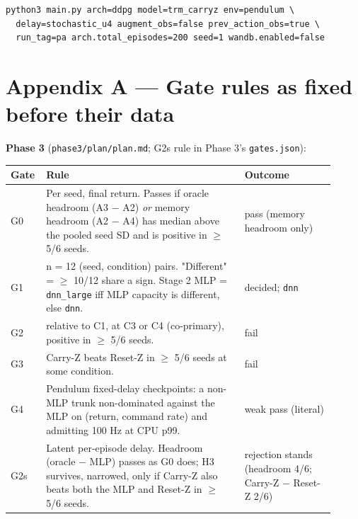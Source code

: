 \documentclass[11pt]{article}
\begin{document}
{\small\begin{verbatim}
python3 main.py arch=ddpg model=trm_carryz env=pendulum \
  delay=stochastic_u4 augment_obs=false prev_action_obs=true \
  run_tag=pa arch.total_episodes=200 seed=1 wandb.enabled=false
\end{verbatim}}



\medskip



\section*{Appendix A --- Gate rules as fixed before their data}



\textbf{Phase 3} (\texttt{phase3/\allowbreak{}plan/\allowbreak{}plan.\allowbreak{}md}; G2s rule in Phase 3's \texttt{gates.json}):



\begin{center}\small\begin{tabular}{>{\raggedright\arraybackslash}p{0.063\linewidth}>{\raggedright\arraybackslash}p{0.580\linewidth}>{\raggedright\arraybackslash}p{0.263\linewidth}}
\toprule
Gate & Rule & Outcome \\
\midrule
G0 & Per seed, final return. Passes if oracle headroom (A3 $-$ A2) \emph{or} memory headroom (A2 $-$ A4) has median above the pooled seed SD and is positive in $\geq$ 5/6 seeds. & pass (memory headroom only) \\
G1 & n = 12 (seed, condition) pairs. "Different" = $\geq$ 10/12 share a sign. Stage 2 MLP = \texttt{dnn\_large} iff MLP capacity is different, else \texttt{dnn}. & decided; \texttt{dnn} \\
G2 & [Carry-Z $-$ MLP] relative to C1, at C3 or C4 (co-primary), positive in $\geq$ 5/6 seeds. & fail \\
G3 & Carry-Z beats Reset-Z in $\geq$ 5/6 seeds at some condition. & fail \\
G4 & Pendulum fixed-delay checkpoints: a non-MLP trunk non-dominated against the MLP on (return, command rate) and admitting 100 Hz at CPU p99. & weak pass (literal) \\
G2s & Latent per-episode delay. Headroom (oracle $-$ MLP) passes as G0 does; H3 survives, narrowed, only if Carry-Z also beats both the MLP and Reset-Z in $\geq$ 5/6 seeds. & rejection stands (headroom 4/6; Carry-Z $-$ Reset-Z 2/6) \\
\bottomrule
\end{tabular}\end{center}
\end{document}
